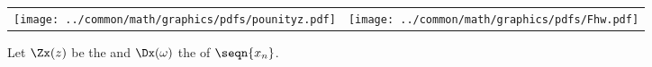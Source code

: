 \begin{center}
\begin{tabular}{cc}
  \texttt{[image: ../common/math/graphics/pdfs/pounityz.pdf]}&\texttt{[image: ../common/math/graphics/pdfs/Fhw.pdf]}
\end{tabular}
\end{center}
\begin{proposition}
\label{prop:tzf}
\label{prop:dsp_zone}
Let $\Zx(z)$ be the  and 
$\Dx(\omega)$ the   of $\seqn{x_n}$.
\end{proposition}
